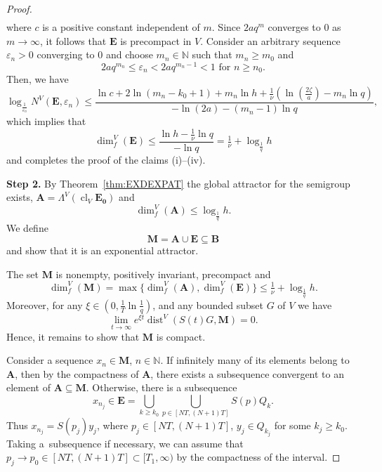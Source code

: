 \documentclass[a4paper,12pt,reqno]{amsart}
\theoremstyle{plain}
\theoremstyle{definition}
\numberwithin{equation}{section}
\newcommand{\N}{\mathbb{N}}
\newcommand{\eps}{\varepsilon}
\newcommand{\dist}{\operatorname{dist}}
\newcommand{\dimf}{\operatorname{dim}_{f}}
\newcommand{\cl}{\operatorname{cl}}
\renewcommand{\geq}{\geqslant}
\renewcommand{\leq}{\leqslant}
\begin{document}
\begin{proof}
\begin{equation*}
\begin{split}
\end{split}
\end{equation*}
where $c$ is a positive constant independent of $m$.
Since $2aq^m$ converges to $0$ as $m\to\infty$, it follows that $\mathbf{E}$
is precompact in $V$. Consider an arbitrary sequence $\eps_n>0$ converging to $0$ and choose
$m_n\in\N$ such that $m_n\geq m_0$ and
$$2aq^{m_n}\leq \eps_n<2aq^{m_n-1}<1\text{ for }n\geq n_0.$$
Then, we have
$$\log_{\frac{1}{\eps_n}}N^{V}(\mathbf{E},\eps_n)\leq\frac{\ln{c}+2\ln(m_n-k_0+1)+m_n\ln{h}+\frac{1}{\nu}\left(\ln(\frac{2\zeta}{a})-m_n\ln{q}\right)}{-\ln(2a)-(m_n-1)\ln{q}},$$
which implies that
$$\dimf^{V}(\mathbf{E})\leq\frac{\ln{h}-\tfrac{1}{\nu}\ln{q}}{-\ln{q}}=\tfrac{1}{\nu}+\log_{\frac{1}{q}}h$$
and completes the proof of the claims (i)--(iv).

\textbf{Step 2.}
By Theorem~\ref{thm:EXDEXPAT} the global attractor for the semigroup exists, $\mathbf{A}=\Lambda^{V}(\cl_{V}\mathbf{E_0})$  and
\begin{equation*}
\dimf^{V}(\mathbf{A})\leq\log_{\frac{1}{q}}h.
\end{equation*}
We define
$$\mathbf{M}=\mathbf{A}\cup\mathbf{E}\subseteq\mathbf{B}$$
and show that it is an exponential attractor. 

The set $\mathbf{M}$ is nonempty, positively invariant, precompact and
$$\dimf^{V}(\mathbf{M})=\max\{\dimf^{V}(\mathbf{A}),\dimf^{V}(\mathbf{E})\}\leq\tfrac{1}{\nu}+\log_{\frac{1}{q}}h.$$
Moreover,  for any $\xi\in(0,\frac{1}{T}\ln{\frac{1}{q}})$, and
any bounded subset $G$ of $V$ we have
$$\lim_{t\to\infty}e^{\xi t}\dist^{V}(S(t)G,\mathbf{M})=0.$$
Hence, it remains to show that $\mathbf{M}$ is compact.

Consider a sequence $x_n\in\mathbf{M}$, $n\in\N$. If infinitely many of its elements belong
to $\mathbf{A}$, then by the compactness of $\mathbf{A}$, there exists a subsequence convergent
to an element of $\mathbf{A}\subseteq\mathbf{M}$. Otherwise,  there is a subsequence
$$x_{n_j}\in\mathbf{E}=\bigcup_{k\geq k_0}\bigcup_{p\in[NT,(N+1)T]}S(p)Q_k.$$
Thus $x_{n_j}=S(p_j)y_j$, where $p_{j}\in[NT,(N+1)T]$, $y_j\in Q_{k_j}$ for some $k_j\geq k_0$.
Taking a~subsequence if necessary, we can assume that $p_j\to p_0\in[NT,(N+1)T]\subset[T_1,\infty)$
by the compactness of the interval.


\end{proof}
\end{document}
